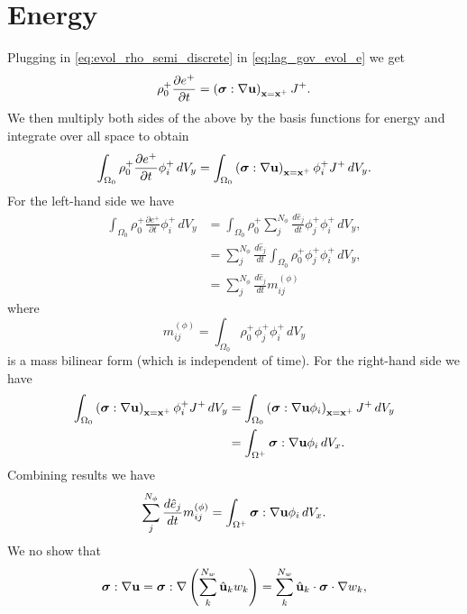 \documentclass[11pt]{article}
\begin{document}
\section{Energy}
Plugging in \cref{eq:evol_rho_semi_discrete} in \cref{eq:lag_gov_evol_e} we get
\begin{equation}
    \rho^+_0 \frac{\partial e^+}{\partial t} = \left ( \bm \sigma : \nabla \mathbf{u} \right )_{\mathbf{x} = \mathbf{x}^+} J^+.
\end{equation}
We then multiply both sides of the above by the basis functions for energy and integrate over all space to obtain
\begin{equation}
    \int_{\Omega_0} \rho^+_0 \frac{\partial e^+}{\partial t} \phi_i^+ \, dV_y = \int_{\Omega_0} \left ( \bm \sigma : \nabla \mathbf{u} \right )_{\mathbf{x} = \mathbf{x}^+} \phi_i^+ J^+ \, dV_y.
\end{equation}
For the left-hand side we have
\begin{align}
    \int_{\Omega_0} \rho^+_0 \frac{\partial e^+}{\partial t} \phi_i^+ \, dV_y &= \int_{\Omega_0} \rho^+_0 \sum_j^{N_\phi} \frac{d \hat{e}_j}{dt} \phi_j^+ \phi_i^+ \, dV_y , \nonumber \\
    &= \sum_j^{N_\phi} \frac{d \hat{e}_j}{dt} \int_{\Omega_0} \rho^+_0 \phi_j^+ \phi_i^+ \, dV_y , \nonumber \\
    &= \sum_j^{N_\phi} \frac{d \hat{e}_j}{dt} m_{ij}^{(\phi)}
\end{align}
where
\begin{equation}
    m_{ij}^{(\phi)} = \int_{\Omega_0} \rho^+_0 \phi_j^+ \phi_i^+ \, dV_y
\end{equation}
is a mass bilinear form (which is independent of time). For the right-hand side we have
\begin{align}
    \int_{\Omega_0} \left ( \bm \sigma : \nabla \mathbf{u} \right )_{\mathbf{x} = \mathbf{x}^+} \phi_i^+ J^+ \, dV_y &= \int_{\Omega_0} \left ( \bm \sigma : \nabla \mathbf{u} \phi_i \right )_{\mathbf{x} = \mathbf{x}^+} J^+ \, dV_y \nonumber \\
    &= \int_{\Omega^+} \bm \sigma : \nabla \mathbf{u} \phi_i \, dV_x. 
\end{align}
Combining results we have
\begin{equation}
    \sum_j^{N_\phi} \frac{d \hat{e}_j}{dt} m_{ij}^{(\phi)} = \int_{\Omega^+} \bm \sigma : \nabla \mathbf{u} \phi_i \, dV_x.
\end{equation}
We no show that
\begin{equation}
    \bm \sigma : \nabla \mathbf{u} = \bm \sigma : \nabla \left ( \sum_k^{N_w} \hat{\mathbf{u}}_k w_k \right ) = \sum_k^{N_w} \hat{\mathbf{u}}_k \cdot \bm \sigma \cdot \nabla w_k,
\end{equation}
\end{document}

